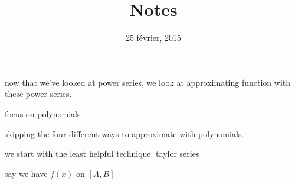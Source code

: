 \documentclass[letterpaper]{article}
\begin{document}
\title{Notes}
\date{25 février, 2015}
\maketitle
now that we've looked at power series, we look at approximating function with these power series.

focus on polynomials

skipping the four different ways to approximate with polynomials.

we start with the least helpful technique. taylor series

say we have $f(x)$ on $[A,B]$
\end{document}
